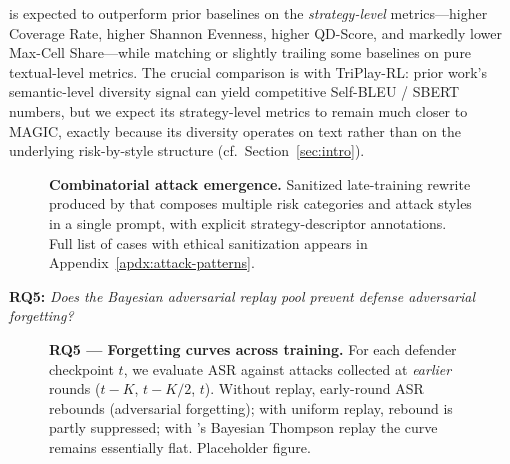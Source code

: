 \method is expected to outperform prior baselines on the \emph{strategy-level} metrics---higher Coverage Rate, higher Shannon Evenness, higher QD-Score, and markedly lower Max-Cell Share---while matching or slightly trailing some baselines on pure textual-level metrics. The crucial comparison is with TriPlay-RL: prior work's semantic-level diversity signal can yield competitive Self-BLEU / SBERT numbers, but we expect its strategy-level metrics to remain much closer to MAGIC, exactly because its diversity operates on text rather than on the underlying risk-by-style structure (cf.\ Section~\ref{sec:intro}).

\begin{figure}[t]
  \centering
  \fbox{\rule[-2.0cm]{0pt}{4.0cm}\rule[-2.0cm]{0.95\linewidth}{0pt}}
  \caption{\textbf{Combinatorial attack emergence.} Sanitized late-training rewrite produced by \method that composes multiple risk categories and attack styles in a single prompt, with explicit strategy-descriptor annotations. Full list of cases with ethical sanitization appears in Appendix~\ref{apdx:attack-patterns}.}
  \label{fig:combinatorial}
\end{figure}

\begin{rqbox}
\textbf{RQ5:} \textit{Does the Bayesian adversarial replay pool prevent defense adversarial forgetting?}
\end{rqbox}

\begin{figure}[t]
  \centering
  \fbox{\rule[-2.3cm]{0pt}{4.6cm}\rule[-2.3cm]{0.95\linewidth}{0pt}}
  \caption{\textbf{RQ5 — Forgetting curves across training.} For each defender checkpoint $t$, we evaluate ASR against attacks collected at \emph{earlier} rounds ($t{-}K$, $t{-}K/2$, $t$). Without replay, early-round ASR rebounds (adversarial forgetting); with uniform replay, rebound is partly suppressed; with \method's Bayesian Thompson replay the curve remains essentially flat. Placeholder figure.}
  \label{fig:forgetting}
\end{figure}

